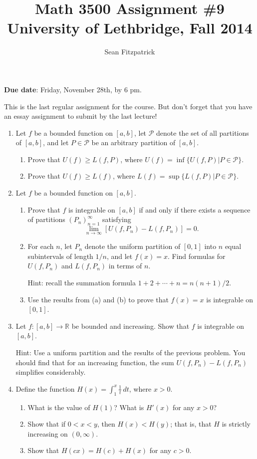 \documentclass[letterpaper,12pt]{article}
\title{Math 3500 Assignment \#9\\University of Lethbridge, Fall 2014}
\author{Sean Fitzpatrick}
\newcommand{\R}{\mathbb{R}}
\begin{document}
 \maketitle


{\bf Due date}: Friday, November 28th, by 6 pm.

\bigskip

This is the last regular assignment for the course. But don't forget that you have an essay assignment to submit by the last lecture!
\begin{enumerate}
 \item Let $f$ be a bounded function on $[a,b]$, let $\mathcal{P}$ denote the set of all partitions of $[a,b]$, and let $P\in \mathcal{P}$ be an arbitrary partition of $[a,b]$.
\begin{enumerate}
 \item Prove that $U(f)\geq L(f,P)$, where $U(f) = \inf\{U(f,P) | P\in\mathcal{P}\}$.
 \item Prove that $U(f)\geq L(f)$, where $L(f)=\sup\{L(f,P) | P\in\mathcal{P}\}$.
\end{enumerate}
 \item Let $f$ be a bounded function on $[a,b]$.
\begin{enumerate}
 \item Prove that $f$ is integrable on $[a,b]$ if and only if there exists a sequence of partitions $(P_n)_{n=1}^\infty$ satisfying
\[
 \lim_{n\to\infty}[U(f,P_n)-L(f,P_n)]=0.
\]
 \item For each $n$, let $P_n$ denote the uniform partition of $[0,1]$ into $n$ equal subintervals of length $1/n$, and let $f(x)=x$. Find formulas for $U(f,P_n)$ and $L(f,P_n)$ in terms of $n$.

Hint: recall the summation formula $1+2+\cdots+n = n(n+1)/2$.
 \item Use the results from (a) and (b) to prove that $f(x)=x$ is integrable on $[0,1]$.
\end{enumerate}
 \item Let $f:[a,b]\to\R$ be bounded and increasing. Show that $f$ is integrable on $[a,b]$.

Hint: Use a uniform partition and the results of the previous problem. You should find that for an increasing function, the sum $U(f,P_n)-L(f,P_n)$ simplifies considerably.
\newpage
 \item Define the function $\displaystyle H(x) = \int_1^x\frac{1}{t}\,dt$, where $x>0$.
\begin{enumerate}
 \item What is the value of $H(1)$? What is $H'(x)$ for any $x>0$?
 \item Show that if $0<x<y$, then $H(x)<H(y)$; that is, that $H$ is strictly increasing on $(0,\infty)$.
 \item Show that $H(cx)=H(c)+H(x)$ for any $c>0$.


\end{enumerate}
\end{enumerate}
\end{document}
